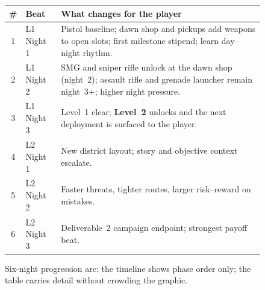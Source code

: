 \documentclass[11pt]{article}
\begin{document}
\begin{figure}[H]
    \centering

    \vspace{0.5em}
    \begin{minipage}{\textwidth}
        \centering
        \footnotesize
        \begin{tabular}{@{}c l p{}@{}}
            \toprule
            \textbf{\#} & \textbf{Beat} & \textbf{What changes for the player} \\
            \midrule
            1 & L1 Night 1 & Pistol baseline; dawn shop and pickups add weapons to open slots; first milestone stipend; learn day--night rhythm. \\
            2 & L1 Night 2 & SMG and sniper rifle unlock at the dawn shop (night~$2$); assault rifle and grenade launcher remain night~$3$+; higher night pressure. \\
            3 & L1 Night 3 & Level~1 clear; \textbf{Level~2} unlocks and the next deployment is surfaced to the player. \\
            4 & L2 Night 1 & New district layout; story and objective context escalate. \\
            5 & L2 Night 2 & Faster threats, tighter routes, larger risk--reward on mistakes. \\
            6 & L2 Night 3 & Deliverable~2 campaign endpoint; strongest payoff beat. \\
            \bottomrule
        \end{tabular}
    \end{minipage}

    \caption{Six-night progression arc: the timeline shows phase order only; the table carries detail without crowding the graphic.}
\end{figure}
\end{document}
